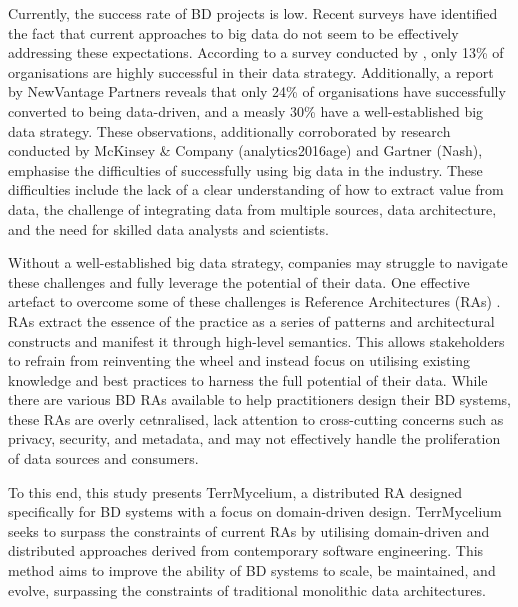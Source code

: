 \documentclass[preprint,12pt]{elsarticle}
\begin{document}
Currently, the success rate of BD projects is low. Recent surveys have identified the fact that current approaches to big data do not seem to be effectively addressing these expectations. According to a survey conducted by \cite{DataBricksSurvey}, only 13\% of organisations are highly successful in their data strategy. Additionally, a report by NewVantage Partners reveals that only 24\% of organisations have successfully converted to being data-driven, and a measly 30\% have a well-established big data strategy. These observations, additionally corroborated by research conducted by McKinsey \& Company (analytics2016age) and Gartner (Nash), emphasise the difficulties of successfully using big data in the industry. These difficulties include the lack of a clear understanding of how to extract value from data, the challenge of integrating data from multiple sources, data architecture, and the need for skilled data analysts and scientists. 

Without a well-established big data strategy, companies may struggle to navigate these challenges and fully leverage the potential of their data. One effective artefact to overcome some of these challenges is Reference Architectures (RAs) \cite{Cloutier2010}. RAs extract the essence of the practice as a series of patterns and architectural constructs and manifest it through high-level semantics. This allows stakeholders to refrain from reinventing the wheel and instead focus on utilising existing knowledge and best practices to harness the full potential of their data. While there are various BD RAs available to help practitioners design their BD systems, these RAs are overly cetnralised, lack attention to cross-cutting concerns such as privacy, security, and metadata, and may not effectively handle the proliferation of data sources and consumers.

To this end, this study presents TerrMycelium, a distributed RA designed specifically for BD systems with a focus on domain-driven design. TerrMycelium seeks to surpass the constraints of current RAs by utilising domain-driven and distributed approaches derived from contemporary software engineering. This method aims to improve the ability of BD systems to scale, be maintained, and evolve, surpassing the constraints of traditional monolithic data architectures.
\end{document}

